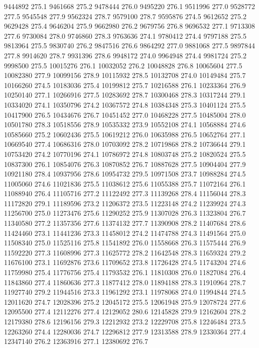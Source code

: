 9444892 275.1
9461668 275.2
9478444 276.0
9495220 276.1
9511996 277.0
9528772 277.5
9545548 277.9
9562324 278.7
9579100 278.7
9595876 274.5
9612652 275.2
9629428 275.4
9646204 275.9
9662980 276.2
9679756 276.8
9696532 277.1
9713308 277.6
9730084 278.0
9746860 278.3
9763636 274.1
9780412 274.4
9797188 275.5
9813964 275.5
9830740 276.2
9847516 276.6
9864292 277.0
9881068 277.5
9897844 277.8
9914620 278.7
9931396 278.6
9948172 274.0
9964948 274.4
9981724 275.2
9998500 275.5
10015276 276.1
10032052 276.2
10048828 276.8
10065604 277.5
10082380 277.9
10099156 278.9
10115932 278.5
10132708 274.0
10149484 275.7
10166260 274.5
10183036 275.4
10199812 275.7
10216588 276.1
10233364 276.9
10250140 277.1
10266916 277.5
10283692 278.7
10300468 278.3
10317244 279.1
10334020 274.1
10350796 274.2
10367572 274.8
10384348 275.3
10401124 275.5
10417900 276.5
10434676 276.7
10451452 277.0
10468228 277.5
10485004 278.0
10501780 278.3
10518556 278.9
10535332 273.9
10552108 274.1
10568884 274.6
10585660 275.2
10602436 275.5
10619212 276.0
10635988 276.5
10652764 277.1
10669540 277.4
10686316 278.0
10703092 278.2
10719868 278.2
10736644 279.1
10753420 274.2
10770196 274.1
10786972 274.8
10803748 275.2
10820524 275.5
10837300 276.1
10854076 276.3
10870852 276.7
10887628 277.5
10904404 277.9
10921180 278.4
10937956 278.6
10954732 279.5
10971508 273.7
10988284 274.5
11005060 274.6
11021836 275.5
11038612 275.6
11055388 275.7
11072164 276.1
11088940 276.4
11105716 277.2
11122492 277.3
11139268 278.4
11156044 278.3
11172820 279.1
11189596 273.2
11206372 273.5
11223148 274.2
11239924 274.3
11256700 275.0
11273476 275.6
11290252 275.9
11307028 276.3
11323804 276.7
11340580 277.2
11357356 277.6
11374132 277.7
11390908 278.2
11407684 278.6
11424460 273.1
11441236 273.3
11458012 274.2
11474788 274.3
11491564 275.0
11508340 275.0
11525116 275.8
11541892 276.0
11558668 276.3
11575444 276.9
11592220 277.3
11608996 277.3
11625772 278.2
11642548 278.3
11659324 279.2
11676100 273.1
11692876 273.6
11709652 273.8
11726428 274.5
11743204 274.6
11759980 275.4
11776756 275.4
11793532 276.1
11810308 276.0
11827084 276.4
11843860 277.4
11860636 277.3
11877412 278.0
11894188 278.3
11910964 278.7
11927740 279.2
11944516 273.3
11961292 273.1
11978068 274.0
11994844 274.5
12011620 274.7
12028396 275.2
12045172 275.5
12061948 275.9
12078724 277.6
12095500 277.4
12112276 277.4
12129052 280.6
12145828 279.9
12162604 278.2
12179380 278.6
12196156 279.3
12212932 273.2
12229708 275.8
12246484 273.5
12263260 274.4
12280036 274.7
12296812 277.9
12313588 278.9
12330364 277.4
12347140 276.2
12363916 277.1
12380692 276.7
